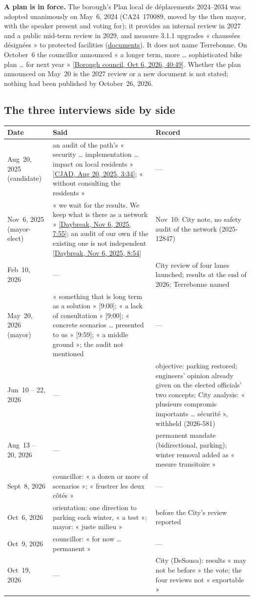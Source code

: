 \documentclass[11pt,letterpaper]{article}
\newcommand{\repourl}{https://github.com/OpenMobilityData/Terrebonne-open-sources}
\newcommand{\doc}[2]{\href{\repourl/blob/main/#1}{#2}}
\newcommand{\cliptime}[1]{\textsf{\small[#1]}}
\newcommand{\octsix}[2]{\href{\repourl/blob/main/2026-10-06-borough-council/derived/#1}{\textsf{\small[Borough council, Oct 6, 2026, #2]}}}
\newcommand{\cjad}[1]{\href{\repourl/blob/main/2025-08-20-cjad-valenzuela/derived/2025-08-20_CJAD_Valenzuela_transcript_en.md}{\textsf{\small[CJAD, Aug 20, 2025, #1]}}}
\newcommand{\dbnov}[1]{\href{\repourl/blob/main/2025-11-06-cbc-daybreak-valenzuela/derived/2025-11-06_CBC_Daybreak_Valenzuela_transcript_en.md}{\textsf{\small[Daybreak, Nov 6, 2025, #1]}}}
\begin{document}
\textbf{A plan is in force.} The borough's Plan local de déplacements
2024--2034 was adopted unanimously on May~6, 2024 (CA24~170089, moved by the
then mayor, with the speaker present and voting for); it provides an
internal review in 2027 and a public mid-term review in 2029, and measure
3.1.1 upgrades « chaussées désignées » to protected facilities
(\doc{2024-cdn-ndg-pld/}{documents}). It does not name Terrebonne. On
October~6 the councillor announced « a longer term, more … sophisticated
bike plan … for next year » \octsix{2026-10-06_01.md}{40:49}. Whether the
plan announced on May~20 is the 2027 review or a new document is not stated;
nothing had been published by October~26, 2026.

\subsection{The three interviews side by side}

\begin{small}
\begin{longtable}{>{\raggedright\arraybackslash}p{2.6cm}>{\raggedright\arraybackslash}p{6.2cm}>{\raggedright\arraybackslash}p{6.0cm}}
\toprule
Date & Said & Record \\
\midrule
\endhead
Aug~20, 2025 (candidate) & an audit of the path's « security … implementation … impact on local residents » \cjad{3:34}; « without consulting the residents » & — \\
Nov~6, 2025 (mayor-elect) & « we wait for the results. We keep what is there as a network » \dbnov{7:55}; an audit of our own if the existing one is not independent \dbnov{8:54} & Nov~10: City note, no safety audit of the network (2025-12847) \\
Feb~10, 2026 & — & City review of four lanes launched; results at the end of 2026; Terrebonne named \\
May~20, 2026 (mayor) & « something that is long term as a solution » \cliptime{9:00}; « a lack of consultation » \cliptime{9:00}; « concrete scenarios … presented to us » \cliptime{9:59}; « a middle ground »; the audit not mentioned & — \\
Jun~10 -- 22, 2026 & — & objective: parking restored; engineers' opinion already given on the elected officials' two concepts; City analysis: « plusieurs compromis importants … sécurité », withheld (2026-581) \\
Aug~13 -- 20, 2026 & — & permanent mandate (bidirectional, parking); winter removal added as « mesure transitoire » \\
Sept~8, 2026 & councillor: « a dozen or more of scenarios »; « frustrer les deux côtés » & — \\
Oct~6, 2026 & orientation: one direction to parking each winter, « a test »; mayor: « juste milieu » & before the City's review reported \\
Oct~9, 2026 & councillor: « for now … permanent » & — \\
Oct~19, 2026 & — & City (DeSousa): results « may not be before » the vote; the four reviews not « exportable » \\
\bottomrule
\end{longtable}
\end{small}
\end{document}
